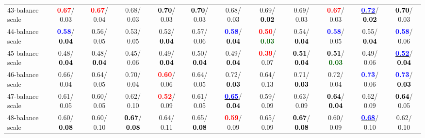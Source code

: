 \begin{table}[h]
\begin{center}
{\begin{tabular}{lc|c|c|c|c|c|c|c|c|c|c}
43-balance scale & \textcolor{red}{\textbf{  0.67}}/  0.03 & \textcolor{red}{\textbf{  0.67}}/  0.04 &   0.68/  0.03 & \textcolor{black}{\textbf{  0.70}}/  0.03 & \textcolor{black}{\textbf{  0.70}}/  0.03 &   0.68/  0.03 &   0.69/\textcolor{black}{\textbf{  0.02}} &   0.69/  0.03 & \textcolor{red}{\textbf{  0.67}}/  0.03 & \underline{\textcolor{blue}{\textbf{  0.72}}}/\textcolor{black}{\textbf{  0.02}} & \textcolor{black}{\textbf{  0.70}}/  0.03 \\
44-balance scale & \textcolor{blue}{\textbf{  0.58}}/\textcolor{black}{\textbf{  0.04}} &   0.56/  0.05 &   0.53/  0.05 &   0.52/\textcolor{black}{\textbf{  0.04}} &   0.57/  0.06 & \textcolor{blue}{\textbf{  0.58}}/\textcolor{black}{\textbf{  0.04}} & \textcolor{red}{\textbf{  0.50}}/\textcolor{darkgreen}{\textbf{  0.03}} &   0.54/\textcolor{black}{\textbf{  0.04}} & \textcolor{blue}{\textbf{  0.58}}/  0.05 &   0.55/\textcolor{black}{\textbf{  0.04}} & \textcolor{blue}{\textbf{  0.58}}/  0.06 \\
45-balance scale &   0.48/\textcolor{black}{\textbf{  0.04}} &   0.48/\textcolor{black}{\textbf{  0.04}} &   0.45/  0.06 &   0.49/\textcolor{black}{\textbf{  0.04}} &   0.50/\textcolor{black}{\textbf{  0.04}} &   0.49/\textcolor{black}{\textbf{  0.04}} & \textcolor{red}{\textbf{  0.39}}/  0.07 & \textcolor{black}{\textbf{  0.51}}/\textcolor{black}{\textbf{  0.04}} & \textcolor{black}{\textbf{  0.51}}/\textcolor{darkgreen}{\textbf{  0.03}} &   0.49/  0.06 & \underline{\textcolor{blue}{\textbf{  0.52}}}/\textcolor{black}{\textbf{  0.04}} \\
46-balance scale &   0.66/  0.04 &   0.64/  0.05 &   0.70/  0.04 & \textcolor{red}{\textbf{  0.60}}/  0.06 &   0.64/  0.05 &   0.72/\textcolor{black}{\textbf{  0.03}} &   0.64/  0.13 &   0.71/\textcolor{black}{\textbf{  0.03}} &   0.72/  0.04 & \textcolor{blue}{\textbf{  0.73}}/  0.06 & \textcolor{blue}{\textbf{  0.73}}/\textcolor{black}{\textbf{  0.03}} \\ \hline
47-balance scale &   0.61/  0.05 &   0.60/  0.05 &   0.62/  0.10 & \textcolor{red}{\textbf{  0.52}}/  0.09 &   0.61/  0.05 & \underline{\textcolor{blue}{\textbf{  0.65}}}/\textcolor{black}{\textbf{  0.04}} &   0.59/  0.09 &   0.63/  0.09 & \textcolor{black}{\textbf{  0.64}}/\textcolor{black}{\textbf{  0.04}} &   0.62/  0.09 & \textcolor{black}{\textbf{  0.64}}/  0.05 \\
48-balance scale &   0.60/\textcolor{black}{\textbf{  0.08}} &   0.60/  0.10 & \textcolor{black}{\textbf{  0.67}}/\textcolor{black}{\textbf{  0.08}} &   0.64/  0.11 &   0.65/\textcolor{black}{\textbf{  0.08}} & \textcolor{red}{\textbf{  0.59}}/  0.09 &   0.65/  0.09 & \textcolor{black}{\textbf{  0.67}}/\textcolor{black}{\textbf{  0.08}} &   0.60/  0.09 & \underline{\textcolor{blue}{\textbf{  0.68}}}/  0.10 &   0.62/  0.10 \\

\end{tabular}}
\end{center}
\end{table}
